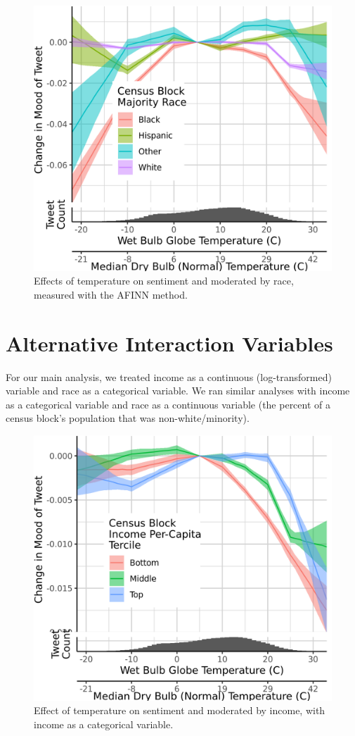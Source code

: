 \documentclass{article}
\begin{document}
\begin{figure}[H]
  \centering
  \includegraphics[width=0.6\linewidth]{../res/afinn-wbgt-race_q.png}
  \caption{Effects of temperature on sentiment and moderated by race, measured with the AFINN method.}
\end{figure}


\section{Alternative Interaction Variables}
For our main analysis, we treated income as a continuous (log-transformed) variable and race as a categorical variable.  We ran similar analyses with income as a categorical variable and race as a continuous variable (the percent of a census block's population that was non-white/minority).

\begin{figure}[H]
  \centering
  \includegraphics[width=0.6\linewidth]{../res/wbgt-income_q.png}
  \caption{Effect of temperature on sentiment and moderated by income, with income as a categorical variable.}
\end{figure}
\end{document}
